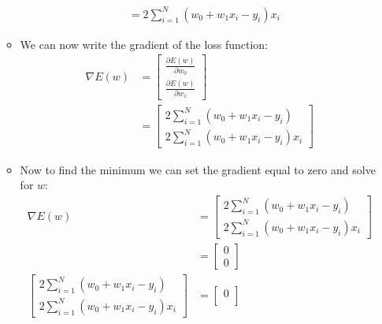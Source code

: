 \documentclass[12pt]{article}
\begin{document}
\begin{itemize}
\begin{itemize}
\begin{align*}
                            &= 2 \sum_{i=1}^N (w_0 + w_1x_i - y_i)x_i
                        \end{align*}
                        \item We can now write the gradient of the loss function:
                        \begin{align*}
                            \nabla E(w) &= \begin{bmatrix}
                                \frac{\partial E(w)}{\partial w_0}\\
                                \frac{\partial E(w)}{\partial w_1}
                            \end{bmatrix}\\
                            &= \begin{bmatrix}
                                2 \sum_{i=1}^N (w_0 + w_1x_i - y_i)\\
                                2 \sum_{i=1}^N (w_0 + w_1x_i - y_i)x_i
                            \end{bmatrix}
                        \end{align*}
                        \item Now to find the minimum we can set the gradient equal to zero and solve for $w$:
                        \begin{align*}
                            \nabla E(w) &= \begin{bmatrix}
                                2 \sum_{i=1}^N (w_0 + w_1x_i - y_i)\\
                                2 \sum_{i=1}^N (w_0 + w_1x_i - y_i)x_i
                            \end{bmatrix}\\
                            &= \begin{bmatrix}
                                0\\
                                0
                            \end{bmatrix}\\
                            \begin{bmatrix}
                                2 \sum_{i=1}^N (w_0 + w_1x_i - y_i)\\
                                2 \sum_{i=1}^N (w_0 + w_1x_i - y_i)x_i
                            \end{bmatrix} &= \begin{bmatrix}
                                0\\

\end{bmatrix}
\end{align*}
\end{itemize}
\end{itemize}
\end{document}
